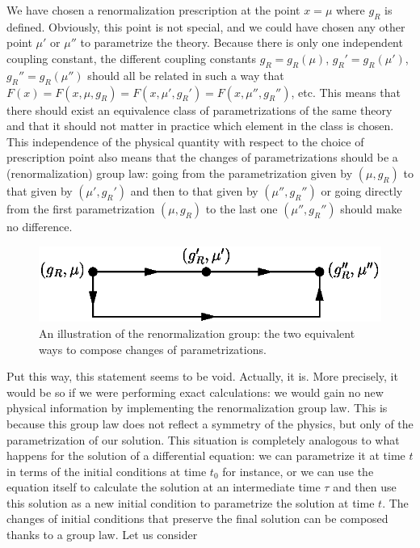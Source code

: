 \documentclass[floatfix,twocolumn,preprintnumbers,amsmath,amssymb,prb]{revtex4}
\begin{document}
We have chosen a renormalization prescription at the point $x=\mu$
where $g_R$ is defined. Obviously, this point is not special, and
we could have chosen any other point
$\mu'$ or $\mu''$ to parametrize the theory. Because there is only
one independent coupling constant, the different coupling constants
$g_R=g_R(\mu)$, $g_R'=g_R(\mu')$, $g_R''=g_R(\mu'')$ should all be
related in such a way that
$F(x)=F(x,\mu,g_R)=F(x,\mu',g_R')=F(x,\mu'',g_R'')$, etc. 
This means that there should exist an equivalence class of
parametrizations of the same theory and that it should not matter
in practice which element in the class is chosen. This independence
of the physical quantity with respect to the choice of
prescription point also means that the changes of parametrizations
should be a (renormalization) group law: going from the 
parametrization given by $(\mu,g_R)$ to that given by
$(\mu',g_R')$ and then to that given by $(\mu'',g_R'')$ or going
directly from the first parametrization $(\mu,g_R)$ to the
last one
$(\mu'',g_R'')$ should make no difference.
\begin{figure}[htbp] 
\begin{center}
\includegraphics[width=.9\linewidth,origin=tl]{diag_RG.eps}\hfill%
\end{center}
\caption{An illustration of the renormalization group: the two equivalent ways to compose changes of parametrizations.}
\label{diagRG}
\end{figure}
Put this way, this statement seems to be 
void. Actually, it is. More precisely, it would be so if
we were performing exact calculations: we would gain no new
physical information by implementing the renormalization group
law. This is because this group law does not reflect a symmetry
of the physics, but only of the parametrization of our solution.
This situation is completely analogous to what happens for
the solution of a differential equation: we can parametrize it at
time $t$ in terms of the initial conditions at time $t_0$ for
instance, or we can use the equation itself to calculate the
solution at an intermediate time $\tau$ and then use this solution
as a new initial condition to parametrize the solution at time
$t$. The changes of initial conditions that preserve the final
solution can be composed thanks to a group law. Let us consider
\end{document}
